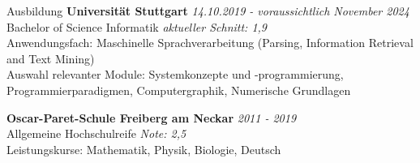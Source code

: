 \documentclass{resume} %
\begin{document}

\begin{rSection}{Ausbildung}
{\bf Universität Stuttgart} \hfill {\em 14.10.2019 - voraussichtlich November 2024} 
\\ Bachelor of Science Informatik \hfill {\em aktueller Schnitt: 1,9}
\\ Anwendungsfach: Maschinelle Sprachverarbeitung (Parsing, Information Retrieval and Text Mining)
\\ Auswahl relevanter Module: Systemkonzepte und -programmierung, Programmierparadigmen, Computergraphik, Numerische Grundlagen


{\bf Oscar-Paret-Schule Freiberg am Neckar} \hfill {\em 2011 - 2019} 
\\ Allgemeine Hochschulreife \hfill {\em Note: 2,5}
\\ Leistungskurse: Mathematik, Physik, Biologie, Deutsch
\end{rSection}

\end{document}
